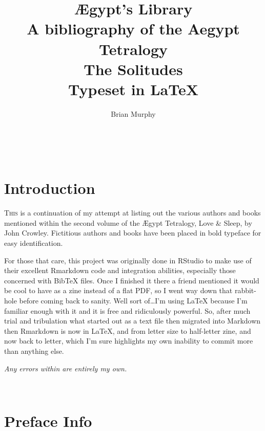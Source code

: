 \documentclass[12pt,makeidx]{extreport}
\author{Brian Murphy}
\title{
 {\Huge Ægypt's Library} \\
 {\footnotesize A bibliography of the Aegypt Tetralogy \\
 \bigskip
 {\Large The Solitudes} \\
 \bigskip
 Typeset in \LaTeX{} \\
 }
}
\date{\begin{small}\today{}\end{small}}
\newcommand\fleuron{\begin{turn}{45}\Large \ding{166}\end{turn}}
\newcommand\doublefleuron{%
	\reflectbox{\fleuron}\AC\staveXLIX\reflectbox{\AC}\fleuron}
\newcommand\fleuronbar{%
	{\huge\LinearACCCXIII}\xrfill[1.3ex]{1pt}\doublefleuron\xrfill[1.3ex]{1pt}\reflectbox{\huge\LinearACCCXIII}}
\newcommand\blankpage{%
    \null
    \thispagestyle{empty}%
    \addtocounter{page}{-1}%
    \newpage%
    \pagestyle{fancy}}
\newcommand\nbvspace[1][3]{\vspace*{\stretch{#1}}}
\begin{document}
%



\setcounter{tocdepth}{2}
\tableofcontents

\begin{center}
\vfill
\shadowoffset{1pt}
\shadowtext{%
{\color{Mahogany}\fontsize{50}{54}\Saturn}}\\
\nbvspace[1]
\end{center}

\pagestyle{fancy}

\accanthis
\pagestyle{fancy}
\chapter{Introduction}
\lettrine[lines=4,findent=3pt]{T}{his} is a continuation of my attempt at listing out the various authors and books mentioned within the second volume of the Ægypt Tetralogy, Love \& Sleep, by John Crowley. Fictitious authors and books have been placed in bold typeface for easy identification. 

For those that care, this project was originally done in RStudio to make use of their excellent Rmarkdown code and integration abilities, especially those concerned with BibTeX files. Once I finished it there a friend mentioned it would be cool to have as a zine instead of a flat PDF, so I went way down that rabbit-hole before coming back to sanity. Well sort of\dots I'm using \LaTeX{} because I'm familiar enough with it and it is free and ridiculously powerful. So, after much trial and tribulation what started out as a text file then migrated into Markdown then Rmarkdown is now in \LaTeX{}, and from letter size to half-letter zine, and now back to letter, which I'm sure highlights my own inability to commit more than anything else.

\vspace*{1cm}

\begin{center}
	\textit{Any errors within are entirely my own.}
\end{center}

\begin{center}
\vfill
\shadowoffset{1pt}
\shadowtext{%
{\color{Mahogany}\fontsize{60}{64}\Mercury}}\\
\nbvspace[1]
\end{center}

\chapter{Preface Info}
\end{document}
